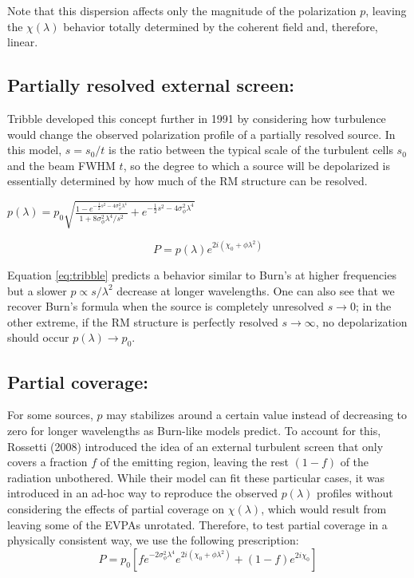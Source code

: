 Note that this dispersion affects only the magnitude of the polarization $p$, leaving the $\chi(\lambda)$ behavior totally determined by the coherent field and, therefore, linear.
\\

\subsection{Partially resolved external screen:}
Tribble developed this concept further in 1991 by considering how turbulence would change the observed polarization profile of a partially resolved source. In this model, $s = s_0/t$ is the ratio between the typical scale of the turbulent cells $s_0$ and the beam FWHM $t$, so the degree to which a source will be depolarized is essentially determined by how much of the RM structure can be resolved.
\begin{center}
$\displaystyle p(\lambda)  = p_0\sqrt{\frac{1-e^{-\frac{1}{2}s^2-4\sigma_\phi^2\lambda^4}}{1+8\sigma_\phi^2\lambda^4/s^2}+e^{-\frac{1}{2}s^2-4\sigma_\phi^2\lambda^4}}$
\end{center}
\begin{equation}\label{eq:tribble} 
    \displaystyle  P  =  p(\lambda)e^{2i(\chi_0+\phi\lambda^2)}
\end{equation}

Equation \ref{eq:tribble} predicts a behavior similar to Burn's at higher frequencies but a slower $p\propto s/\lambda^{2}$ decrease at longer wavelengths. One can also see that we recover Burn's formula when the source is completely unresolved $s\rightarrow 0$; in the other extreme, if the RM structure is perfectly resolved $s\rightarrow \infty$, no depolarization should occur $p(\lambda)\rightarrow p_0$.
\\

\subsection{Partial coverage:}
For some sources, $p$ may stabilizes around a certain value instead of decreasing to zero for longer wavelengths as Burn-like models predict. To account for this, Rossetti (2008) introduced the idea of an external turbulent screen that only covers a fraction $f$ of the emitting region, leaving the rest $(1-f)$ of the radiation unbothered.
While their model can fit these particular cases, it was introduced in an ad-hoc way to reproduce the observed $p(\lambda)$ profiles without considering the effects of partial coverage on $\chi(\lambda)$, which would result from leaving some of the EVPAs unrotated. Therefore, to test partial coverage in a physically consistent way, we use the following prescription:
\begin{equation}\label{eq:partial}
    \displaystyle P=p_0 [fe^{-2\sigma_{\phi}^2\lambda^4}e^{2i(\chi_0+\phi\lambda^2)}+(1-f)e^{2i\chi_0}]
\end{equation}

